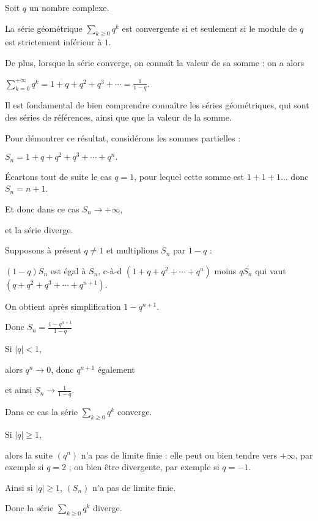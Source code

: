 Soit $q$ un nombre complexe.

\change
La série géométrique $\sum_{k \ge 0} q^k$ est convergente si et seulement 
si le module de $q$ est strictement inférieur à $1$. 

\change
De plus, lorsque la série converge, on connaît la valeur de sa somme : on a alors 

$\displaystyle \sum_{k=0}^{+\infty} q^k =1+q+q^2+q^3+\cdots= \frac{1}{1-q}$.

Il est fondamental de bien comprendre connaître les séries géométriques, qui sont des séries de références, 
ainsi que que la valeur de la somme.


\diapo

Pour démontrer ce résultat, considérons les sommes partielles :

$S_n=1+q+q^2+q^3+\cdots+q^n.$

\change
\'Ecartons tout de suite le cas $q=1$, pour lequel cette 
somme est $1+1+1...$ donc $S_n = n+1$. 

\change
Et donc dans ce cas $S_n \to +\infty$, 

\change
et la série diverge.

\change  
Supposons à présent $q \neq 1$ et multiplions $S_n$ par $1-q$ :

\change
$(1-q)S_n$ est égal à $S_n$, c-à-d $(1+q+q^2+\cdots+q^n)$ 
moins $qS_n$ qui vaut $(q+q^2+q^3+\cdots+q^{n+1})$.

\change
On obtient après simplification $1-q^{n+1}$.

\change
Donc
$\displaystyle S_n  = \frac{1-q^{n+1}}{1-q}$

\change
Si $|q|<1$, 

\change
alors $q^n \to 0$, donc $q^{n+1}$ également 

\change
et ainsi $S_n \to \frac{1}{1-q}$.

\change
Dans ce cas la série $\sum_{k \ge 0} q^k$ converge.

\change
Si $|q| \ge 1$, 

\change
alors la suite $(q^n)$ n'a pas de limite finie : elle peut ou bien tendre vers $+\infty$, par exemple si $q=2$ ; ou bien être divergente, par exemple si $q=-1$.

\change
Ainsi si $|q| \ge 1$, $(S_n)$ n'a pas de limite finie.

\change
Donc la série $\sum_{k \ge 0} q^k$ diverge.


\diapo

